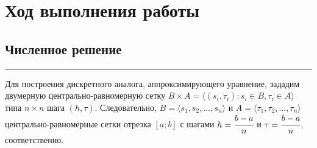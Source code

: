 \documentclass[a4paper, 14pt]{extarticle}
\begin{document}
\newpage

\section*{Ход выполнения работы}

\subsection*{Численное решение}\vspace{-20pt}\rule{\linewidth}{0.1mm}

Для построения дискретного аналога, аппроксимирующего уравнение, 
зададим двумерную центрально-равномерную сетку 
$B \times A = \langle(s_i, \tau_i) : s_i \in B, \tau_i \in A \rangle$ 
типа $n \times n$ шага $(h, \tau)$. Следовательно, $B = \langle s_1, s_2, \dots, s_n \rangle$ 
и $A = \langle \tau_1, \tau_2, \dots, \tau_n \rangle$ центрально-равномерные сетки отрезка 
$\left[ a; b \right]$ с шагами $h = \cfrac{b-a}{n}$ и $\tau = \cfrac{b - a}{n}$, 
соответственно.\\
\end{document}
